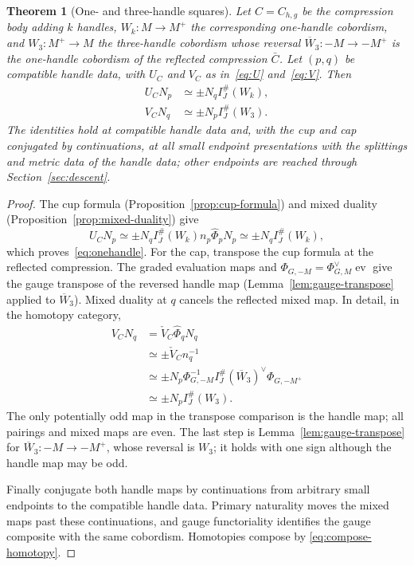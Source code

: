\documentclass[11pt]{amsart}
\newtheorem{theorem}{Theorem}[section]
\theoremstyle{definition}
\theoremstyle{remark}
\theoremstyle{plain}
\numberwithin{equation}{section}
\newcommand{\IG}{I^{\#}_{J}}
\newcommand{\ev}{\operatorname{ev}}
\begin{document}
\begin{theorem}[One- and three-handle squares]\label{thm:handles}
Let $C=C_{h,g}$ be the compression body adding
$k$ handles, $W_k:M\to M^+$ the corresponding
one-handle cobordism, and $W_3:M^+\to M$ the
three-handle cobordism whose reversal
$\overline W_3:-M\to-M^+$ is the one-handle
cobordism of the reflected compression $\bar C$.
Let $(p,q)$ be compatible handle data, with
$U_C$ and $V_C$ as in~\eqref{eq:U}
and~\eqref{eq:V}. Then
\begin{align}
 U_CN_p&\simeq\pm N_q\IG(W_k),
                                      \label{eq:onehandle}\\
 V_CN_q&\simeq\pm N_p\IG(W_3).
                                      \label{eq:threehandle}
\end{align}
The identities hold at compatible handle
data and, with the cup and cap conjugated by
continuations, at all small endpoint
presentations with the splittings and metric
data of the handle data; other endpoints are
reached through Section~\ref{sec:descent}.
\end{theorem}
\begin{proof}
The cup formula (Proposition~\ref{prop:cup-formula})
and mixed duality (Proposition~\ref{prop:mixed-duality}) give
\[
 U_CN_p\simeq
 \pm N_q\IG(W_k)n_p\widehat\Phi_pN_p
 \simeq\pm N_q\IG(W_k),
\]
which proves~\eqref{eq:onehandle}.
For the cap, transpose the cup formula
at the reflected compression. The
graded evaluation maps and
$\Phi_{G,-M}=\Phi_{G,M}^\vee\ev$
give the gauge transpose of the reversed handle map (Lemma~\ref{lem:gauge-transpose} applied to $\overline W_3$). Mixed duality
at $q$ cancels the reflected mixed
map. In detail, in the homotopy
category,
\begin{align*}
 V_CN_q
 &=\check V_C\widehat\Phi_qN_q\\
 &\simeq\pm\check V_C n_q^{-1}\\
 &\simeq\pm N_p\Phi_{G,-M}^{-1}
            \IG(\overline W_3)^\vee
            \Phi_{G,-M^+}\\
 &\simeq\pm N_p\IG(W_3).
\end{align*}
The only potentially odd map in the
transpose comparison is the handle
map; all pairings and mixed maps
are even. The last step is Lemma~\ref{lem:gauge-transpose} for $\overline W_3:-M\to-M^+$, whose reversal is $W_3$; it holds with one sign although the handle map may be odd.

Finally conjugate both handle maps
by continuations from arbitrary
small endpoints to the
compatible handle data. Primary
naturality moves the mixed maps
past these continuations, and
gauge functoriality identifies the
gauge composite with the same
cobordism. Homotopies compose by
\eqref{eq:compose-homotopy}.
\end{proof}
\end{document}
